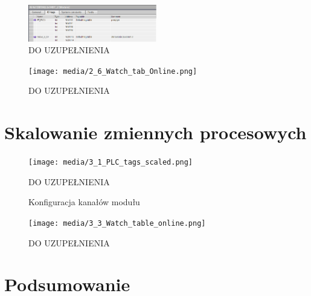 \documentclass{article}
\begin{document}
\begin{figure}[H]
    \centering
    \includegraphics[width=0.5\textwidth]{media/2_5_Tagi_moduł_2.png}
    \caption{DO UZUPEŁNIENIA}
    \label{fig:zdj8}
\end{figure}

\begin{figure}[H]
    \centering
    \texttt{[image: media/2\_6\_Watch\_tab\_Online.png]}
    \caption{DO UZUPEŁNIENIA}
    \label{fig:zdj9}
\end{figure}

\newpage
\section{Skalowanie zmiennych procesowych}
\begin{figure}[H]
    \centering
    \texttt{[image: media/3\_1\_PLC\_tags\_scaled.png]}
    \caption{DO UZUPEŁNIENIA}
    \label{fig:zdj10}
\end{figure}

\begin{figure}[!ht]
    \centering
            \hfill
    \caption{Konfiguracja kanałów modułu}
    \label{fig:main1}
\end{figure}


\begin{figure}[H]
    \centering
    \texttt{[image: media/3\_3\_Watch\_table\_online.png]}
    \caption{DO UZUPEŁNIENIA}
    \label{fig:zdj14}
\end{figure}

\newpage
\section{Podsumowanie}
\end{document}
